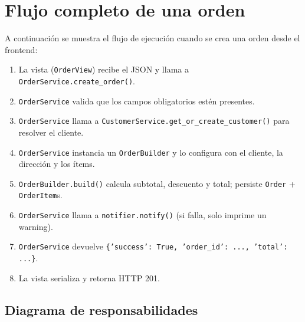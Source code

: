 \documentclass[12pt, a4paper]{article}
\begin{document}
\newpage
\section{Flujo completo de una orden}

A continuación se muestra el flujo de ejecución cuando se crea una orden desde el frontend:

\begin{center}
\begin{tcolorbox}[
    colback=grisClaro, colframe=grisBorde,
    width=0.95\linewidth, arc=4pt,
    title=\textbf{Flujo: POST /api/orders/}
]
\begin{enumerate}[leftmargin=2em, label=\textbf{\arabic*.}]
    \item La vista (\texttt{OrderView}) recibe el JSON y llama a \texttt{OrderService.create\_order()}.
    \item \texttt{OrderService} valida que los campos obligatorios estén presentes.
    \item \texttt{OrderService} llama a \texttt{CustomerService.get\_or\_create\_customer()} para resolver el cliente.
    \item \texttt{OrderService} instancia un \texttt{OrderBuilder} y lo configura con el cliente, la dirección y los ítems.
    \item \texttt{OrderBuilder.build()} calcula subtotal, descuento y total; persiste \texttt{Order} + \texttt{OrderItem}s.
    \item \texttt{OrderService} llama a \texttt{notifier.notify()} (si falla, solo imprime un warning).
    \item \texttt{OrderService} devuelve \texttt{\{'success': True, 'order\_id': ..., 'total': ...\}}.
    \item La vista serializa y retorna HTTP 201.
\end{enumerate}
\end{tcolorbox}
\end{center}

\subsection{Diagrama de responsabilidades}
\end{document}
